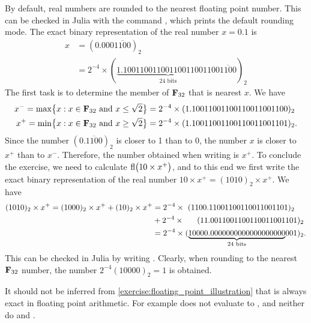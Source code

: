 \begin{solution}
    By default, real numbers are rounded to the nearest floating point number.
    This can be checked in Julia with the command ,
    which prints the default rounding mode.
    The exact binary representation of the real number $x = 0.1$ is
    \begin{align*}
        x
        &= (0.000\overline{1100})_2 \\
        &= 2^{-4} \times (\underbrace{1.10011001100110011001100}_{\text{24 bits}}\overline{1100})_2
    \end{align*}
    The first task is to determine the member of $\mathbf F_{32}$ that is nearest $x$.
    We have
    \begin{align*}
        x^- = \max \bigl\{x: x \in \mathbf F_{32} \text{ and } x \leq \sqrt{2}\bigr\} &= 2^{-4} \times (1.10011001100110011001100)_2 \\
        x^+ = \min \bigl\{x: x \in \mathbf F_{32} \text{ and } x \geq \sqrt{2}\bigr\} &= 2^{-4} \times (1.10011001100110011001101)_2.
    \end{align*}
    Since the number $(0.\overline{1100})_2$ is closer to 1 than to 0,
    the number $x$ is closer to $x^+$ than to $x^-$.
    Therefore, the number obtained when writing  is $x^+$.
    To conclude the exercise,
    we need to calculate ${\rm fl}\bigl(10 \times x^+\bigr)$,
    and to this end we first write the exact binary representation of the real number $10 \times x^+ = (1010)_2 \times x^+$.
    We have
    \begin{align*}
        (1010)_2 \times  x^+
        = (1000)_2 \times x^+ + (10)_2 \times x^+
        &= 2^{-4} \times ~ (1100.11001100110011001101)_2 \\
        & + 2^{-4} \times \hspace{.45cm}~(11.0011001100110011001101)_2 \\
        &= 2^{-4} \times (\underbrace{10000.0000000000000000000}_{\text{24 bits}}\!001)_2.
    \end{align*}
    This can be checked in Julia by writing .
    Clearly, when rounding to the nearest $\mathbf F_{32}$ number,
    the number $2^{-4} (10000)_2 = 1$ is obtained.
\end{solution}

\begin{remark}
    It should not be inferred from \cref{exercise:floating_point_illustration} that  is always exact in floating point arithmetic.
    For example  does not evaluate to ,
    and neither do  and .
\end{remark}

